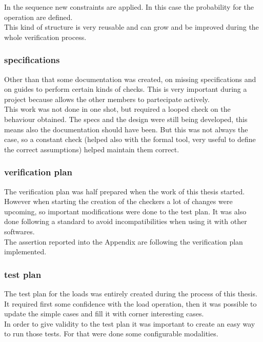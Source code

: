 In the sequence new constraints are applied. In this case the probability for the operation are defined.\\

This kind of structure is very reusable and can grow and be improved during the whole verification process.\\

\subsubsection{specifications}
Other than that some documentation was created, on missing specifications and on guides to perform certain kinds of checks. This is very important during a project because allows the other members to partecipate actively.\\

This work was not done in one shot, but required a looped check on the behaviour obtained. The specs and the design were still being developed, this means also the documentation should have been. But this was not always the case, so a constant check (helped also with the formal tool, very useful to define the correct assumptions) helped maintain them correct.\\

\subsubsection{verification plan}
The verification plan was half prepared when the work of this thesis started. However when starting the creation of the checkers a lot of changes were upcoming, so important modifications were done to the test plan. It was also done following a standard to avoid incompatibilities when using it with other softwares.\\
The assertion reported into the Appendix are following the verification plan implemented.\\

\subsubsection{test plan}
The test plan for the loads was entirely created during the process of this thesis. It required first some confidence with the load operation, then it was possible to update the simple cases and fill it with corner interesting cases.\\

In order to give validity to the test plan it was important to create an easy way to run those tests. For that were done some configurable modalities.\\


